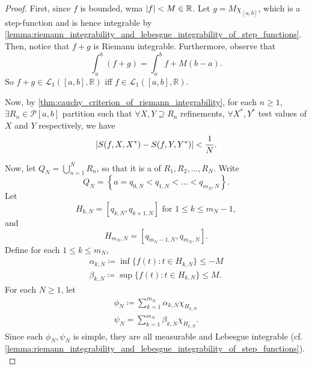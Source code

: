\documentclass[notoc,notitlepage]{tufte-book}
\begin{document}
\begin{proof}
  First, since $f$ is bounded, wma $\left|f\right| < M \in \mathbb{R}$. Let $g =
  M\chi_{[a, b]}$, which is a step-function and is hence integrable by
  \cref{lemma:riemann_integrability_and_lebesgue_integrability_of_step_functions}.
  Then, notice that $f + g$ is Riemann integrable. Furthermore, observe that
  \begin{equation*}
    \int_{a}^{b} (f + g) = \int_{a}^{b} f + M(b - a).
  \end{equation*}
  So $f + g \in \mathcal{L}_1([a, b], \mathbb{R})$ iff $f \in \mathcal{L}_1([a,
  b], \mathbb{R})$.

  Now, by \cref{thm:cauchy_criterion_of_riemann_integrability}, for each $n \geq
  1$, $\exists R_n \in \mathcal{P}[a, b]$ partition such that $\forall X, Y
  \supseteq R_n$ refinements, $\forall X^*, Y^*$ test values of $X$ and $Y$ 
  respectively, we have
  \begin{equation*}
    \left|S(f, X, X^*) - S(f, Y, Y^*)\right| < \frac{1}{N}.
  \end{equation*}

   Now, let $Q_N = \bigcup_{n=1}^{N}
  R_n$, so that it is a  of $R_1, R_2, \ldots, R_N$.
  Write
  \begin{equation*}
    Q_N = \left\{ a = q_{0,N} < q_{1, N} < \hdots < q_{m_N,N} \right\}.
  \end{equation*}
   Let
  \begin{equation*}
    H_{k,N} = [q_{k,N}, q_{k+1, N}] \text{ for } 1 \leq k \leq m_N - 1,
  \end{equation*}
  and
  \begin{equation*}
    H_{m_N,N} = [q_{m_N-1, N}, q_{m_N,N}].
  \end{equation*}
   Define for each $1
  \leq k \leq m_N$,
  \begin{gather*}
    \alpha_{k, N} \coloneqq \inf \{ f(t) : t \in H_{k, N} \} \leq -M \\
    \beta_{k,N} \coloneqq \sup \{ f(t) : t \in H_{k, N} \} \leq M.
  \end{gather*}
   For each $N \geq 1$, let
  \begin{gather*}
    \phi_{N} \coloneqq \sum_{k=1}^{m_N} \alpha_{k, N} \chi_{H_{k, N}} \\
    \psi_{N} = \sum_{k=1}^{m_N} \beta_{k,N} \chi_{H_{k,N}}.
  \end{gather*}
  Since each $\phi_N, \psi_N$ is simple, they are all measurable and Lebesgue
  integrable (cf.
  \cref{lemma:riemann_integrability_and_lebesgue_integrability_of_step_functions}).


\end{proof}
\end{document}
